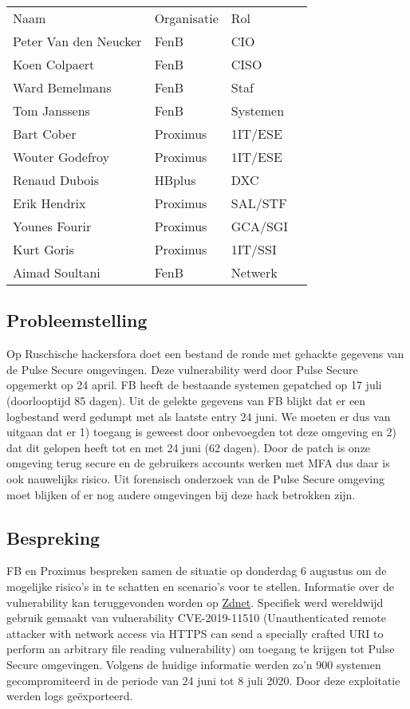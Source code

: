 \documentclass[11pt]{article}
\begin{document}
\begin{center}
\begin{tabular}{llll}
Naam & Organisatie & Rol & \\
Peter Van den Neucker & FenB & CIO & \\
Koen Colpaert & FenB & CISO & \\
Ward Bemelmans & FenB & Staf & \\
Tom Janssens & FenB & Systemen & \\
Bart Cober & Proximus & 1IT/ESE & \\
Wouter Godefroy & Proximus & 1IT/ESE & \\
Renaud Dubois & HBplus & DXC & \\
Erik Hendrix & Proximus & SAL/STF & \\
Younes Fourir & Proximus & GCA/SGI & \\
Kurt Goris & Proximus & 1IT/SSI & \\
Aimad Soultani & FenB & Netwerk & \\
\end{tabular}
\end{center}

\subsection{Probleemstelling}
\label{sec:org6cda8d8}

Op Ruschische hackersfora doet een bestand de ronde met gehackte gegevens van de Pulse Secure omgevingen. Deze vulnerability werd door Pulse Secure opgemerkt op 24 april. FB heeft de bestaande systemen gepatched op 17 juli (doorlooptijd 85 dagen). Uit de gelekte gegevens van FB blijkt dat er een logbestand werd gedumpt met als laatste entry 24 juni. We moeten er dus van uitgaan dat er 1) toegang is geweest door onbevoegden tot deze omgeving en 2) dat dit gelopen heeft tot en met 24 juni (62 dagen). Door de patch is onze omgeving terug secure en de gebruikers accounts werken met MFA dus daar is ook nauwelijks risico. Uit forensisch onderzoek van de Pulse Secure omgeving moet blijken of er nog andere omgevingen bij deze hack betrokken zijn.

\subsection{Bespreking}
\label{sec:orgcd35e86}

FB en Proximus bespreken samen de situatie op donderdag 6 augustus om de mogelijke risico's in te schatten en scenario's voor te stellen. Informatie over de vulnerability kan teruggevonden worden op \href{https://www.zdnet.com/article/hacker-leaks-passwords-for-900-enterprise-vpn-servers/}{Zdnet}. Specifiek werd wereldwijd gebruik gemaakt van vulnerability CVE-2019-11510 (Unauthenticated remote attacker with network access via HTTPS can send a specially crafted URI to perform an arbitrary file reading vulnerability) om toegang te krijgen tot Pulse Secure omgevingen. Volgens de huidige informatie werden zo'n 900 systemen gecompromiteerd in de periode van 24 juni tot 8 juli 2020. Door deze exploitatie werden logs geëxporteerd.
\end{document}
